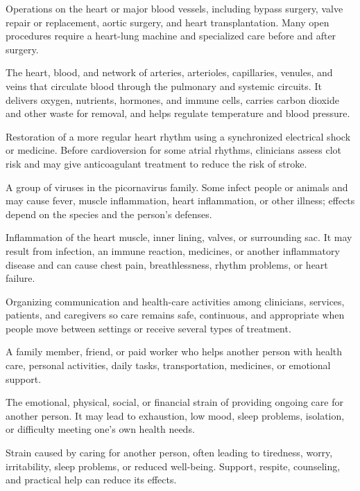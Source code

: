  Operations on the heart or major blood vessels, including bypass surgery, valve repair or replacement, aortic surgery, and heart transplantation. Many open procedures require a heart-lung machine and specialized care before and after surgery.

 The heart, blood, and network of arteries, arterioles, capillaries, venules, and veins that circulate blood through the pulmonary and systemic circuits. It delivers oxygen, nutrients, hormones, and immune cells, carries carbon dioxide and other waste for removal, and helps regulate temperature and blood pressure.

 Restoration of a more regular heart rhythm using a synchronized electrical shock or medicine. Before cardioversion for some atrial rhythms, clinicians assess clot risk and may give anticoagulant treatment to reduce the risk of stroke.

 A group of viruses in the picornavirus family. Some infect people or animals and may cause fever, muscle inflammation, heart inflammation, or other illness; effects depend on the species and the person's defenses.

 Inflammation of the heart muscle, inner lining, valves, or surrounding sac. It may result from infection, an immune reaction, medicines, or another inflammatory disease and can cause chest pain, breathlessness, rhythm problems, or heart failure.

 Organizing communication and health-care activities among clinicians, services, patients, and caregivers so care remains safe, continuous, and appropriate when people move between settings or receive several types of treatment.

 A family member, friend, or paid worker who helps another person with health care, personal activities, daily tasks, transportation, medicines, or emotional support.

 The emotional, physical, social, or financial strain of providing ongoing care for another person. It may lead to exhaustion, low mood, sleep problems, isolation, or difficulty meeting one's own health needs.

 Strain caused by caring for another person, often leading to tiredness, worry, irritability, sleep problems, or reduced well-being. Support, respite, counseling, and practical help can reduce its effects.

